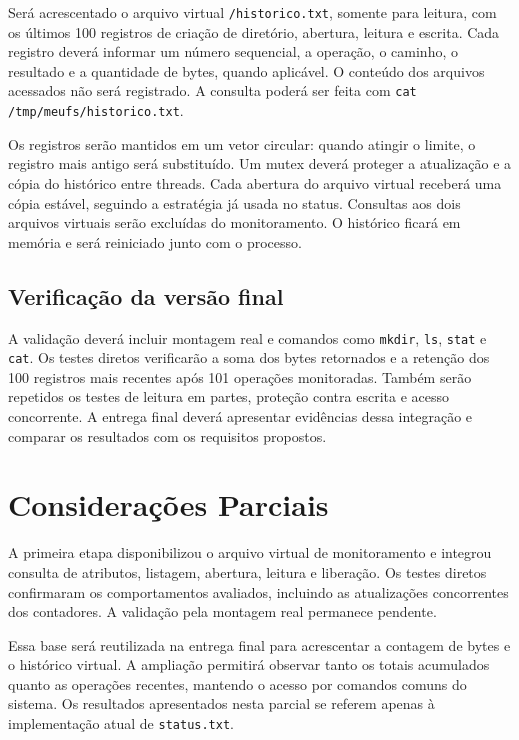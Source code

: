 \documentclass[12pt]{article}
\begin{document}
Será acrescentado o arquivo virtual \texttt{/historico.txt}, somente
para leitura, com os últimos 100 registros de criação de diretório,
abertura, leitura e escrita. Cada registro deverá informar um número
sequencial, a operação, o caminho, o resultado e a quantidade de bytes,
quando aplicável. O conteúdo dos arquivos acessados não será registrado.
A consulta poderá ser feita com \texttt{cat /tmp/meufs/historico.txt}.

Os registros serão mantidos em um vetor circular: quando atingir o
limite, o registro mais antigo será substituído. Um mutex deverá proteger
a atualização e a cópia do histórico entre threads. Cada abertura do
arquivo virtual receberá uma cópia estável, seguindo a estratégia já
usada no status. Consultas aos dois arquivos virtuais serão excluídas
do monitoramento. O histórico ficará em memória e será reiniciado
junto com o processo.

\subsection{Verificação da versão final}

A validação deverá incluir montagem real e comandos como \texttt{mkdir},
\texttt{ls}, \texttt{stat} e \texttt{cat}. Os testes diretos verificarão
a soma dos bytes retornados e a retenção dos 100 registros mais recentes
após 101 operações monitoradas. Também serão repetidos os testes de
leitura em partes, proteção contra escrita e acesso concorrente.
A entrega final deverá apresentar evidências dessa integração e comparar
os resultados com os requisitos propostos.

\section{Considerações Parciais}

A primeira etapa disponibilizou o arquivo virtual de monitoramento e
integrou consulta de atributos, listagem, abertura, leitura e liberação.
Os testes diretos confirmaram os comportamentos avaliados, incluindo as
atualizações concorrentes dos contadores. A validação pela montagem real
permanece pendente.

Essa base será reutilizada na entrega final para acrescentar a contagem
de bytes e o histórico virtual. A ampliação permitirá observar tanto os
totais acumulados quanto as operações recentes, mantendo o acesso por
comandos comuns do sistema. Os resultados apresentados nesta parcial
se referem apenas à implementação atual de \texttt{status.txt}.



\end{document}
